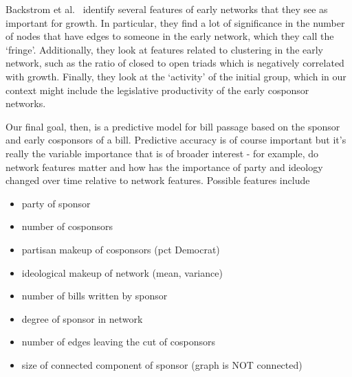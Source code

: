 Backstrom et al.~\cite{Backstrom} identify several features of early networks that they see as important for growth. In particular, they find a lot of significance in the number of nodes that have edges to someone in the early network, which they call the `fringe'. Additionally, they look at features related to clustering in the early network, such as the ratio of closed to open triads which is negatively correlated with growth. Finally, they look at the `activity' of the initial group, which in our context might include the legislative productivity of the early cosponsor networks.
 
Our final goal, then, is a predictive model for bill passage based on the sponsor and early cosponsors of a bill. Predictive accuracy is of course important but it's really the variable importance that is of broader interest - for example, do network features matter and how has the importance of party and ideology changed over time relative to network features. Possible features include
\begin{itemize}
                \item party of sponsor
                \item number of cosponsors
                \item partisan makeup of cosponsors (pct Democrat)
                \item ideological makeup of network (mean, variance)
                \item number of bills written by sponsor
                \item degree of sponsor in network
                \item number of edges leaving the cut of cosponsors
                \item size of connected component of sponsor (graph is NOT connected)
\end{itemize}